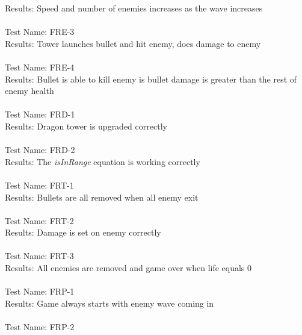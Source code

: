 \documentclass[12,english]{article}
\begin{document}
	Results: Speed and number of enemies increases as the wave increases\\ \\
	
	Test Name: FRE-3 \\
	
	Results: Tower launches bullet and hit enemy, does damage to enemy \\ \\
	
	Test Name: FRE-4 \\
	
	Results: Bullet is able to kill enemy is bullet damage is greater than the rest of enemy health \\ \\
	
	Test Name: FRD-1\\
	
	Results: Dragon tower is upgraded correctly\\ \\
	
	Test Name: FRD-2\\
	
	Results: The \textit{isInRange} equation is working correctly\\ \\
	
	Test Name: FRT-1\\
	
	Results: Bullets are all removed when all enemy exit\\ \\
	
	Test Name: FRT-2\\
	
	Results: Damage is set on enemy correctly\\ \\
	
	Test Name: FRT-3\\
	
	Results: All enemies are removed and game over when life equals 0\\ \\
	
	Test Name: FRP-1\\
	
	Results: Game always starts with enemy wave coming in\\ \\
	
	Test Name: FRP-2\\
	
\end{document}
